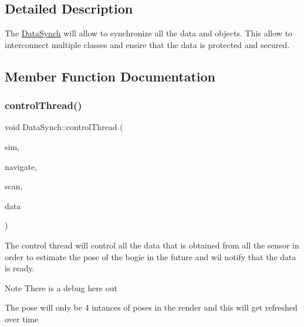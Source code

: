\subsection{Detailed Description}
The \hyperlink{classDataSynch}{Data\+Synch} will allow to synchronize all the data and objects. This allow to interconnect multiple classes and ensire that the data is protected and secured. 

\subsection{Member Function Documentation}
\mbox{\label{classDataSynch_a2f50b744f9f8b3e98b226d1227b0d217}} 
\subsubsection{\texorpdfstring{control\+Thread()}{controlThread()}}
{\footnotesize\ttfamily void Data\+Synch\+::control\+Thread (\begin{DoxyParamCaption}\item[{const std\+::shared\+\_\+ptr$<$ \hyperlink{classSimulator}{Simulator} $>$ \&}]{sim,  }\item[{\hyperlink{classNavigation}{Navigation} \&}]{navigate,  }\item[{\hyperlink{classScanner}{Scanner} \&}]{scan,  }\item[{\hyperlink{classDataSynch}{Data\+Synch} \&}]{data }\end{DoxyParamCaption})}



The control thread will control all the data that is obtained from all the sensor in order to estimate the pose of the bogie in the future and wil notify that the data is ready. 

\begin{DoxyNote}{Note}
There is a debug here out 

The pose will only be 4 intances of poses in the render and this will get refreshed over time 
\end{DoxyNote}


